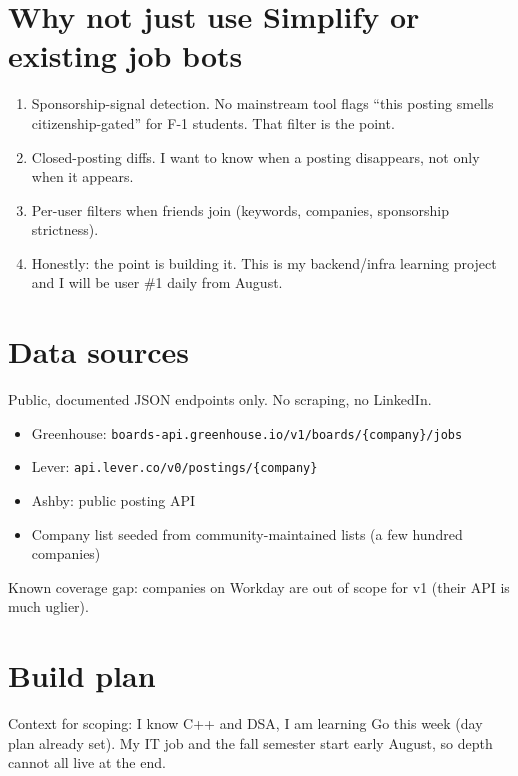 \documentclass[11pt]{article}
\begin{document}
\section*{Why not just use Simplify or existing job bots}

\begin{enumerate}
  \item Sponsorship-signal detection. No mainstream tool flags ``this posting smells citizenship-gated'' for F-1 students. That filter is the point.
  \item Closed-posting diffs. I want to know when a posting disappears, not only when it appears.
  \item Per-user filters when friends join (keywords, companies, sponsorship strictness).
  \item Honestly: the point is building it. This is my backend/infra learning project and I will be user \#1 daily from August.
\end{enumerate}

\section*{Data sources}

Public, documented JSON endpoints only. No scraping, no LinkedIn.

\begin{itemize}
  \item Greenhouse: \texttt{boards-api.greenhouse.io/v1/boards/\{company\}/jobs}
  \item Lever: \texttt{api.lever.co/v0/postings/\{company\}}
  \item Ashby: public posting API
  \item Company list seeded from community-maintained lists (a few hundred companies)
\end{itemize}

Known coverage gap: companies on Workday are out of scope for v1 (their API is much uglier).

\section*{Build plan}

Context for scoping: I know C++ and DSA, I am learning Go this week (day plan already set). My IT job and the fall semester start early August, so depth cannot all live at the end.
\end{document}
